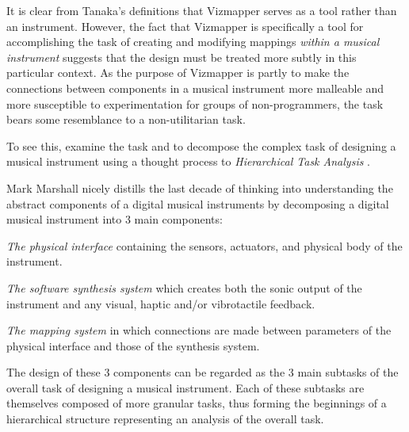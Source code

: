 It is clear from Tanaka's definitions that Vizmapper serves as a tool rather than an instrument. However, the fact that Vizmapper is specifically a tool for accomplishing the task of creating and modifying mappings \emph{within a musical instrument} suggests that the design must be treated more subtly in this particular context. As the purpose of Vizmapper is partly to make the connections between components in a musical instrument more malleable and more susceptible to experimentation for groups of non-programmers, the task bears some resemblance to a non-utilitarian task.

To see this, examine the task and to decompose the complex task of designing a musical instrument using a thought process to \emph{Hierarchical Task Analysis} \cite{annett1967}. 

Mark Marshall nicely distills the last decade of thinking into understanding the abstract components of a digital musical instruments by decomposing a digital musical instrument into 3 main components:

\begin{description}
\item \emph{The physical interface} containing the sensors, actuators, and physical body of the instrument.
\item \emph{The software synthesis system} which creates both the sonic output of the instrument and any visual, haptic and/or vibrotactile feedback.
\item \emph{The mapping system} in which connections are made between parameters of the physical interface and those of the synthesis system.
\end{description}

The design of these 3 components can be regarded as the 3 main subtasks of the overall task of designing a musical instrument. Each of these subtasks are themselves composed of more granular tasks, thus forming the beginnings of a hierarchical structure representing an analysis of the overall task.

